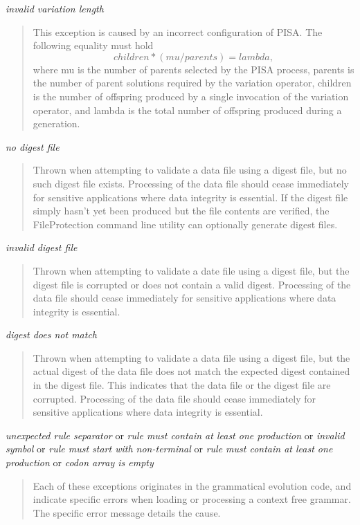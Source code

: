 \noindent
\textit{invalid variation length}
\begin{quote}
  This exception is caused by an incorrect configuration of PISA.  The following equality must hold
  \begin{equation}
    children * (mu / parents) = lambda,
  \end{equation}
  where mu is the number of parents selected by the PISA process, parents is the number of parent solutions required by the variation operator, children is the number of offspring produced by a single invocation of the variation operator, and lambda is the total number of offspring produced during a generation.
\end{quote}

\noindent
\textit{no digest file}
\begin{quote}
  Thrown when attempting to validate a data file using a digest file, but no such digest file exists.  Processing of the data file should cease immediately for sensitive applications where data integrity is essential. If the digest file simply hasn't yet been produced but the file contents are verified, the FileProtection command line utility can optionally generate digest files.
\end{quote}
  
\noindent
\textit{invalid digest file}
\begin{quote}
  Thrown when attempting to validate a date file using a digest file, but the digest file is corrupted or does not contain a valid digest.  Processing of the data file should cease immediately for sensitive applications where data integrity is essential.
\end{quote}

\noindent
\textit{digest does not match}
\begin{quote}
  Thrown when attempting to validate a data file using a digest file, but the actual digest of the data file does not match the expected digest contained in the digest file.  This indicates that the data file or the digest file are corrupted.  Processing of the data file should cease immediately for sensitive applications where data integrity is essential.
\end{quote}
  
\noindent
\textit{unexpected rule separator} or
\textit{rule must contain at least one production} or
\textit{invalid symbol} or
\textit{rule must start with non-terminal} or
\textit{rule must contain at least one production} or
\textit{codon array is empty}
\begin{quote}
  Each of these exceptions originates in the grammatical evolution code, and indicate specific errors when loading or processing a context free grammar. The specific error message details the cause.
\end{quote}

